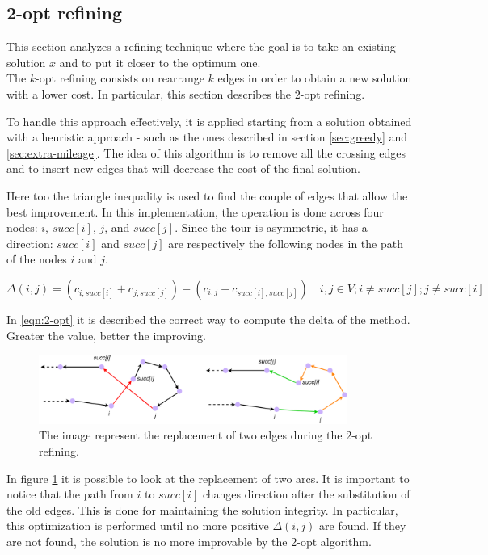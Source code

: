 \subsection{2-opt refining}
This section analyzes a refining technique where the goal is to take an existing solution $x$ and to put it closer to the optimum one.\\
The $k$-opt refining consists on rearrange $k$ edges in order to obtain a new solution with a lower cost. In particular, this section describes the $2$-opt refining.

To handle this approach effectively, it is applied starting from a solution obtained with a heuristic approach - such as the ones described in section \ref{sec:greedy} and \ref{sec:extra-mileage}. The idea of this algorithm is to remove all the crossing edges and to insert new edges that will decrease the cost of the final solution.

Here too the triangle inequality is used to find the couple of edges that allow the best improvement. In this implementation, the operation is done across four nodes: $i$, $succ[i]$, $j$, and $succ[j]$. Since the tour is asymmetric, it has a direction: $succ[i]$ and $succ[j]$ are respectively the following nodes in the path of the nodes $i$ and $j$. 

\begin{equation}
	\label{eqn:2-opt}
	\Delta (i, j) = (c_{i, succ[i]} + c_{j, succ[j]}) - (c_{i, j} + c_{succ[i], succ[j]}) \quad i, j \in V; i\not=succ[j]; j\not=succ[i]
\end{equation}

In \ref{eqn:2-opt} it is described the correct way to compute the delta of the method. Greater the value, better the improving.

\begin{figure}[h]
	\centering
	\includegraphics[width=0.9\textwidth]{images/2_opt_new.png}
	\caption{The image represent the replacement of two edges during the $2$-opt refining.}
	\label{fig:2-opt}
\end{figure}

In figure \ref{fig:2-opt} it is possible to look at the replacement of two arcs. It is important to notice that the path from $i$ to $succ[i]$ changes direction after the substitution of the old edges. This is done for maintaining the solution integrity. In particular, this optimization is performed until no more positive $\Delta(i, j)$ are found. If they are not found, the solution is no more improvable by the 2-opt algorithm.

